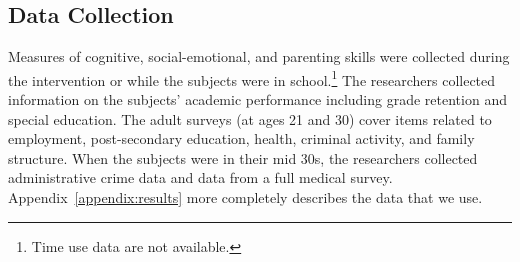 \subsection{Data Collection}

Measures of cognitive, social-emotional, and parenting skills were collected during the intervention or while the subjects were in school.\footnote{Time use data are not available.} The researchers collected information on the subjects' academic performance including grade retention and special education. The adult surveys (at ages 21 and 30) cover items related to employment, post-secondary education, health, criminal activity, and family structure. When the subjects were in their mid 30s, the researchers collected administrative crime data and data from a full medical survey. Appendix~\ref{appendix:results} more completely describes the data that we use.


